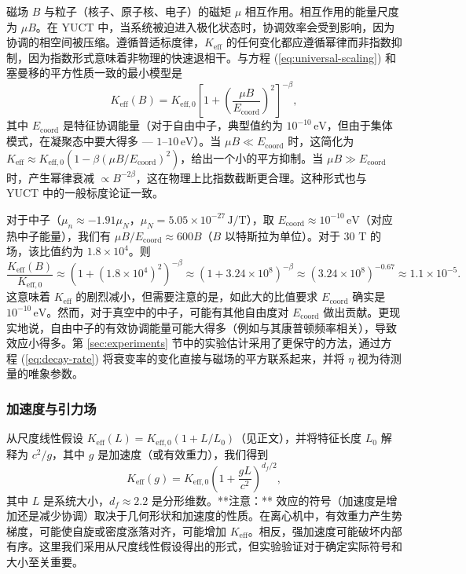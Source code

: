 \documentclass[12pt]{article}
\theoremstyle{remark}
\newcommand{\Keff}{K_{\mathrm{eff}}}
\newcommand{\Keffzero}{K_{\mathrm{eff},0}}
\newcommand{\df}{d_{\!f}}
\begin{document}
	磁场 \(B\) 与粒子（核子、原子核、电子）的磁矩 \(\mu\) 相互作用。相互作用的能量尺度为 \(\mu B\)。在 YUCT 中，当系统被迫进入极化状态时，协调效率会受到影响，因为协调的相空间被压缩。遵循普适标度律，\(\Keff\) 的任何变化都应遵循幂律而非指数抑制，因为指数形式意味着非物理的快速退相干。与方程 (\ref{eq:universal-scaling}) 和塞曼移的平方性质一致的最小模型是
	\begin{equation}
		\Keff(B) = \Keffzero \left[ 1 + \left( \frac{\mu B}{E_{\mathrm{coord}}} \right)^2 \right]^{-\beta},
		\label{eq:keff-B}
	\end{equation}
	其中 \(E_{\mathrm{coord}}\) 是特征协调能量（对于自由中子，典型值约为 \(10^{-10}\,\text{eV}\)，但由于集体模式，在凝聚态中要大得多 — \(1\)–\(10\,\text{eV}\)）。当 \(\mu B \ll E_{\mathrm{coord}}\) 时，这简化为 \(\Keff \approx \Keffzero (1 - \beta (\mu B/E_{\mathrm{coord}})^2)\)，给出一个小的平方抑制。当 \(\mu B \gg E_{\mathrm{coord}}\) 时，产生幂律衰减 \(\propto B^{-2\beta}\)，这在物理上比指数截断更合理。这种形式也与 YUCT 中的一般标度论证一致。
	
	对于中子（\(\mu_n \approx -1.91\mu_N\)，\(\mu_N = 5.05\times 10^{-27}\,\text{J/T}\)），取 \(E_{\mathrm{coord}} \approx 10^{-10}\,\text{eV}\)（对应热中子能量），我们有 \(\mu B / E_{\mathrm{coord}} \approx 600 B\)（\(B\) 以特斯拉为单位）。对于 30 T 的场，该比值约为 \(1.8\times10^4\)。则
	\[
	\frac{\Keff(B)}{\Keffzero} \approx (1 + (1.8\times10^4)^2)^{-\beta} \approx (1 + 3.24\times10^8)^{-\beta} \approx (3.24\times10^8)^{-0.67} \approx 1.1\times10^{-5}.
	\]
	这意味着 \(\Keff\) 的剧烈减小，但需要注意的是，如此大的比值要求 \(E_{\mathrm{coord}}\) 确实是 \(10^{-10}\,\text{eV}\)。然而，对于真空中的中子，可能有其他自由度对 \(E_{\mathrm{coord}}\) 做出贡献。更现实地说，自由中子的有效协调能量可能大得多（例如与其康普顿频率相关），导致效应小得多。第 \ref{sec:experiments} 节中的实验估计采用了更保守的方法，通过方程 (\ref{eq:decay-rate}) 将衰变率的变化直接与磁场的平方联系起来，并将 \(\eta\) 视为待测量的唯象参数。
	
	\subsubsection{加速度与引力场}
	
	从尺度线性假设 \(\Keff(L) = \Keffzero (1 + L/L_0)\)（见正文），并将特征长度 \(L_0\) 解释为 \(c^2/g\)，其中 \(g\) 是加速度（或有效重力），我们得到
	\begin{equation}
		\Keff(g) = \Keffzero \left(1 + \frac{gL}{c^2}\right)^{\df/2},
		\label{eq:keff-g}
	\end{equation}
	其中 \(L\) 是系统大小，\(\df \approx 2.2\) 是分形维数。**注意：** 效应的符号（加速度是增加还是减少协调）取决于几何形状和加速度的性质。在离心机中，有效重力产生势梯度，可能使自旋或密度涨落对齐，可能增加 \(\Keff\)。相反，强加速度可能破坏内部有序。这里我们采用从尺度线性假设得出的形式，但实验验证对于确定实际符号和大小至关重要。
	
\end{document}
